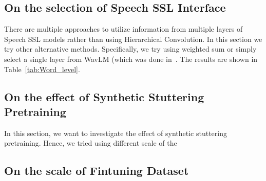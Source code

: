 \subsection{On the selection of Speech SSL Interface}
There are multiple approaches to utilize information from multiple layers of Speech SSL models rather than using Hierarchical Convolution.
In this section we try other alternative methods.
Specifically, we try using weighted sum or simply select a single layer from WavLM (which was done in~\cite{bayerl22b_interspeech,bayerl23_interspeech}.
The results are shown in Table~\ref{tab:Word_level}. 




\subsection{On the effect of Synthetic Stuttering Pretraining}
In this section, we want to investigate the effect of synthetic stuttering pretraining.
Hence, we tried using different scale of the 

\subsection{On the scale of Fintuning Dataset}

